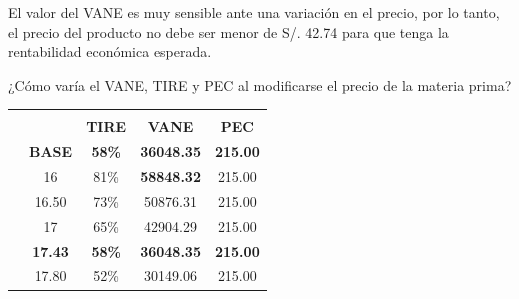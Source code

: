 \documentclass[a4paper,openright,12pt]{book}
\begin{document}
El valor del VANE es muy sensible ante una variación en el precio, por lo tanto, el precio del producto no debe ser menor de S/. 42.74 para que tenga la rentabilidad económica esperada.

¿Cómo varía el VANE, TIRE y PEC al modificarse el precio de la materia prima?

\begin{table}[H]
\begin{tabular}{ccccc}
\multicolumn{1}{l}{}                                & \multicolumn{1}{l}{}              & \multicolumn{3}{c}{\cellcolor[HTML]{1D6194}{\color[HTML]{FFFFFF} \textbf{RESULTADOS}}}                               \\
\multicolumn{1}{l}{}                                & \cellcolor[HTML]{D9D9D9}\textbf{} & \cellcolor[HTML]{D9D9D9}\textbf{TIRE} & \cellcolor[HTML]{D9D9D9}\textbf{VANE} & \cellcolor[HTML]{D9D9D9}\textbf{PEC} \\
\cellcolor[HTML]{75BDA7}                            & \textbf{BASE}                     & \textbf{58\%}                         & \textbf{36048.35}                     & \textbf{215.00}                      \\
\cellcolor[HTML]{75BDA7}                            & \cellcolor[HTML]{FFFF00}16        & 81\%                                  & \textbf{58848.32}                     & 215.00                               \\
\cellcolor[HTML]{75BDA7}                            & 16.50                             & 73\%                                  & 50876.31                              & 215.00                               \\
\cellcolor[HTML]{75BDA7}                            & 17                                & 65\%                                  & 42904.29                              & 215.00                               \\
\rowcolor[HTML]{ABD8CA} 
\cellcolor[HTML]{75BDA7}                            & \textbf{17.43}                    & \textbf{58\%}                         & \textbf{36048.35}                     & \textbf{215.00}                      \\
\cellcolor[HTML]{75BDA7}                            & 17.80                             & 52\%                                  & 30149.06                              & 215.00                               \\

\end{tabular}
\end{table}
\end{document}
